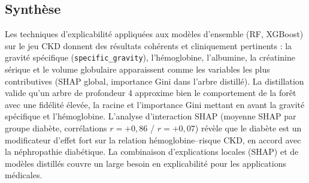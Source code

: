 \subsection{Synthèse}

Les techniques d'explicabilité appliquées aux modèles d'ensemble (RF, XGBoost) sur le jeu CKD donnent des résultats cohérents et cliniquement pertinents : la gravité spécifique (\texttt{specific\_gravity}), l'hémoglobine, l'albumine, la créatinine sérique et le volume globulaire apparaissent comme les variables les plus contributives (SHAP global, importance Gini dans l'arbre distillé). La distillation valide qu'un arbre de profondeur 4 approxime bien le comportement de la forêt avec une fidélité élevée, la racine et l'importance Gini mettant en avant la gravité spécifique et l'hémoglobine. L'analyse d'interaction SHAP (moyenne SHAP par groupe diabète, corrélations $r = +0{,}86$ / $r = +0{,}07$) révèle que le diabète est un modificateur d'effet fort sur la relation hémoglobine--risque CKD, en accord avec la néphropathie diabétique. La combinaison d'explications locales (SHAP) et de modèles distillés couvre un large besoin en explicabilité pour les applications médicales.

